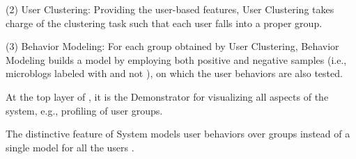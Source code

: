 	\stab(2)  User Clustering: Providing the user-based features, User Clustering takes charge of the clustering task such that each user falls into a proper group.
	
	\stab(3)  Behavior Modeling: For each group obtained by User Clustering, Behavior Modeling builds a  model by employing both positive and negative samples (i.e., microblogs labeled with \retd{} and not \retd{}), on which the user \retg{} behaviors are also tested.
	
 At the top layer of \sys{}, it is the Demonstrator for visualizing all aspects of the system, e.g., profiling of user groups.


The distinctive feature of System  \sys{} models user \retg{} behaviors over groups instead of a single model for all the users \cite{IEEEexample:conf/wsdm/FengW13,IEEEexample:conf/ijcai/ZhangLTCL13}.

